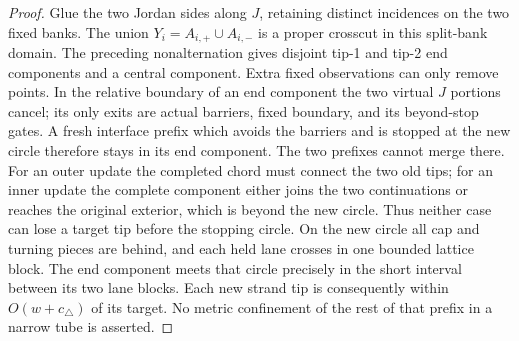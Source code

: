 \begin{proof}
Glue the two Jordan sides along \(J\), retaining distinct incidences
on the two fixed banks.  The union \(Y_i=A_{i,+}\cup A_{i,-}\) is a
proper crosscut in this split-bank domain.  The preceding nonalternation
gives disjoint tip-1 and tip-2 end components and a central component.
Extra fixed observations can only remove points.  In the relative boundary
of an end component the two virtual \(J\) portions cancel; its only exits
are actual barriers, fixed boundary, and its beyond-stop gates.  A fresh
interface prefix which avoids the barriers and is stopped at the new
circle therefore stays in its end component.  The two prefixes cannot
merge there.  For an outer update the completed chord must connect the two
old tips; for an inner update the complete component either joins the two
continuations or reaches the original exterior, which is beyond the new
circle.  Thus neither case can lose a target tip before the stopping circle.
On the new circle all cap and turning pieces are behind,
and each held lane crosses in one bounded lattice block.  The end component
meets that circle precisely in the short interval between its two lane
blocks.  Each new strand tip is consequently within \(O(w+c_\triangle)\)
of its target.  No metric confinement of the rest of that prefix in a
narrow tube is asserted.


\end{proof}
